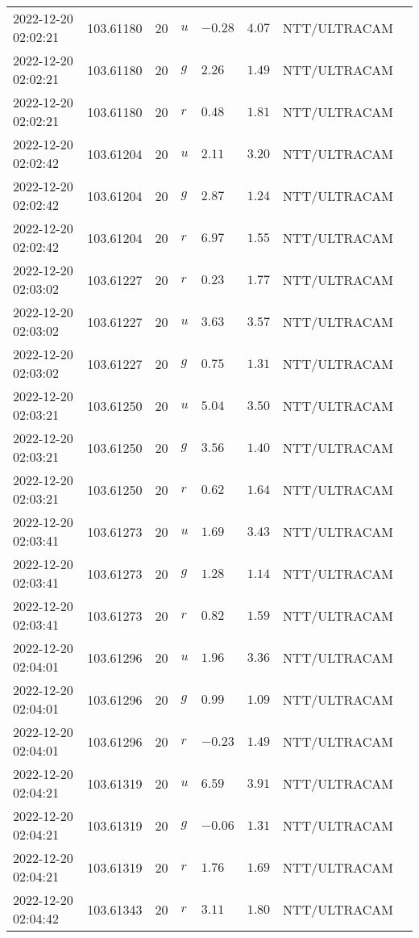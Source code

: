 \documentclass{nature_plusfigure}
\begin{document}
\begin{supplement}
\begin{center}
\begin{longtable}{llllllll}
2022-12-20 02:02:21 & 103.61180 & 20 & $u$ & $-0.28$ & $4.07$ & NTT/ULTRACAM &  \\ 
2022-12-20 02:02:21 & 103.61180 & 20 & $g$ & $2.26$ & $1.49$ & NTT/ULTRACAM &  \\ 
2022-12-20 02:02:21 & 103.61180 & 20 & $r$ & $0.48$ & $1.81$ & NTT/ULTRACAM &  \\ 
2022-12-20 02:02:42 & 103.61204 & 20 & $u$ & $2.11$ & $3.20$ & NTT/ULTRACAM &  \\ 
2022-12-20 02:02:42 & 103.61204 & 20 & $g$ & $2.87$ & $1.24$ & NTT/ULTRACAM &  \\ 
2022-12-20 02:02:42 & 103.61204 & 20 & $r$ & $6.97$ & $1.55$ & NTT/ULTRACAM &  \\ 
2022-12-20 02:03:02 & 103.61227 & 20 & $r$ & $0.23$ & $1.77$ & NTT/ULTRACAM &  \\ 
2022-12-20 02:03:02 & 103.61227 & 20 & $u$ & $3.63$ & $3.57$ & NTT/ULTRACAM &  \\ 
2022-12-20 02:03:02 & 103.61227 & 20 & $g$ & $0.75$ & $1.31$ & NTT/ULTRACAM &  \\ 
2022-12-20 02:03:21 & 103.61250 & 20 & $u$ & $5.04$ & $3.50$ & NTT/ULTRACAM &  \\ 
2022-12-20 02:03:21 & 103.61250 & 20 & $g$ & $3.56$ & $1.40$ & NTT/ULTRACAM &  \\ 
2022-12-20 02:03:21 & 103.61250 & 20 & $r$ & $0.62$ & $1.64$ & NTT/ULTRACAM &  \\ 
2022-12-20 02:03:41 & 103.61273 & 20 & $u$ & $1.69$ & $3.43$ & NTT/ULTRACAM &  \\ 
2022-12-20 02:03:41 & 103.61273 & 20 & $g$ & $1.28$ & $1.14$ & NTT/ULTRACAM &  \\ 
2022-12-20 02:03:41 & 103.61273 & 20 & $r$ & $0.82$ & $1.59$ & NTT/ULTRACAM &  \\ 
2022-12-20 02:04:01 & 103.61296 & 20 & $u$ & $1.96$ & $3.36$ & NTT/ULTRACAM &  \\ 
2022-12-20 02:04:01 & 103.61296 & 20 & $g$ & $0.99$ & $1.09$ & NTT/ULTRACAM &  \\ 
2022-12-20 02:04:01 & 103.61296 & 20 & $r$ & $-0.23$ & $1.49$ & NTT/ULTRACAM &  \\ 
2022-12-20 02:04:21 & 103.61319 & 20 & $u$ & $6.59$ & $3.91$ & NTT/ULTRACAM &  \\ 
2022-12-20 02:04:21 & 103.61319 & 20 & $g$ & $-0.06$ & $1.31$ & NTT/ULTRACAM &  \\ 
2022-12-20 02:04:21 & 103.61319 & 20 & $r$ & $1.76$ & $1.69$ & NTT/ULTRACAM &  \\ 
2022-12-20 02:04:42 & 103.61343 & 20 & $r$ & $3.11$ & $1.80$ & NTT/ULTRACAM &  \\ 

\end{longtable}
\end{center}
\end{supplement}
\end{document}
